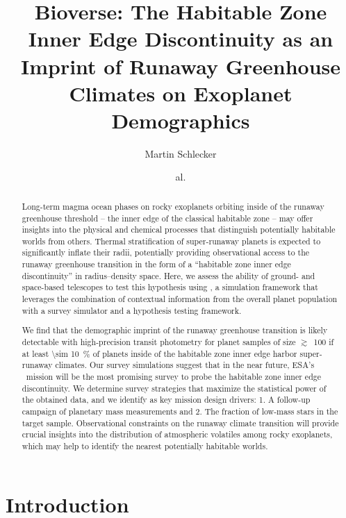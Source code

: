 \documentclass[twocolumn,twocolappendix]{aastex631}
\begin{document}
\title{Bioverse: The Habitable Zone Inner Edge Discontinuity as an Imprint of Runaway Greenhouse Climates on Exoplanet Demographics}

\author[0000-0001-8355-2107]{Martin Schlecker}
\author{al.}

\begin{abstract}
Long-term magma ocean phases on rocky exoplanets orbiting inside of the runaway greenhouse threshold -- the inner edge of the classical habitable zone -- may offer insights into the physical and chemical processes that distinguish potentially habitable worlds from others.
Thermal stratification of super-runaway planets is expected to significantly inflate their radii, potentially providing observational access to the runaway greenhouse transition in the form of a ``habitable zone inner edge discontinuity'' in radius--density space.
Here, we assess the ability of ground- and space-based telescopes to test this hypothesis using \bioverse, a simulation framework that leverages the combination of contextual information from the overall planet population with a survey simulator and a hypothesis testing framework.

We find that the demographic imprint of the runaway greenhouse transition is likely detectable with high-precision transit photometry for planet samples of size $\gtrsim$~100 if at least \SI{\sim 10}{\percent} of planets inside of the habitable zone inner edge harbor super-runaway climates.
Our survey simulations suggest that in the near future, ESA's \plato\ mission will be the most promising survey to probe the habitable zone inner edge discontinuity.
We determine survey strategies that maximize the statistical power of the obtained data, and we identify as key mission design drivers: 1. A follow-up campaign of planetary mass measurements and 2. The fraction of low-mass stars in the target sample.
Observational constraints on the runaway climate transition will provide crucial insights into the distribution of atmospheric volatiles among rocky exoplanets, which may help to identify the nearest potentially habitable worlds.
\end{abstract}

\section{Introduction}
\end{document}
